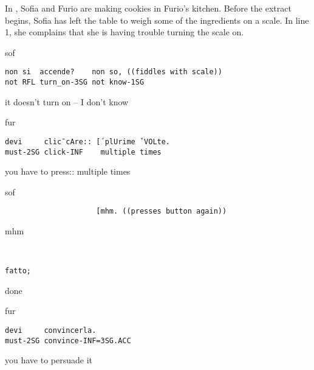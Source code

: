 \documentclass[output=paper,modfonts]{langscibook}
\begin{document}
In , Sofia and Furio are making cookies in Furio's kitchen. Before the extract begins, Sofia has left the table to weigh some of the ingredients on a scale. In line 1, she complains that she is having trouble turning the scale on.

\vspace{2mm}
%
\begin{transbox}{1}{sof}
\begin{verbatim}
non si  accende?    non so, ((fiddles with scale))
not RFL turn_on-3SG not know-1SG
\end{verbatim}
it doesn't turn on -- I don't know
\end{transbox}\vspace{2mm}
%
\begin{mdframednoverticalspace}[style=firstfoc]
\begin{transbox}{2}{fur}
\begin{verbatim}
devi     clic¯cAre:: [´plUrime ˇVOLte.
must-2SG click-INF    multiple times
\end{verbatim}
you have to press:: multiple times
\end{transbox}
\end{mdframednoverticalspace}\vspace{2mm}
%
\begin{mdframednoverticalspace}[style=secondfoc]
\begin{transbox}{3}{sof}
\begin{verbatim}
                     [mhm. ((presses button again))
\end{verbatim}
\hspace{3.2cm} mhm
\end{transbox}
\end{mdframednoverticalspace}
%
\begin{transbox}{4}{~}
\begin{verbatim}
fatto;
\end{verbatim}
done
\end{transbox}
%
\begin{transbox}{5}{fur}
\begin{verbatim}
devi     convincerla.
must-2SG convince-INF=3SG.ACC
\end{verbatim}
you have to persuade it
\end{transbox}\bigskip
\end{document}
